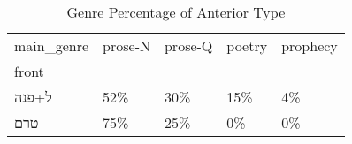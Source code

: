\begin{table}[htbp!]
\centering
\caption{Genre Percentage of Anterior Type}
\label{table:angenre_pc}
\begin{tabular}{lllll}
\toprule
main\_genre & prose-N & prose-Q & poetry & prophecy \\
front &         &         &        &          \\
\midrule
ל+פנה &     52\% &     30\% &    15\% &       4\% \\
טרם   &     75\% &     25\% &     0\% &       0\% \\
\bottomrule
\end{tabular}
\end{table}
